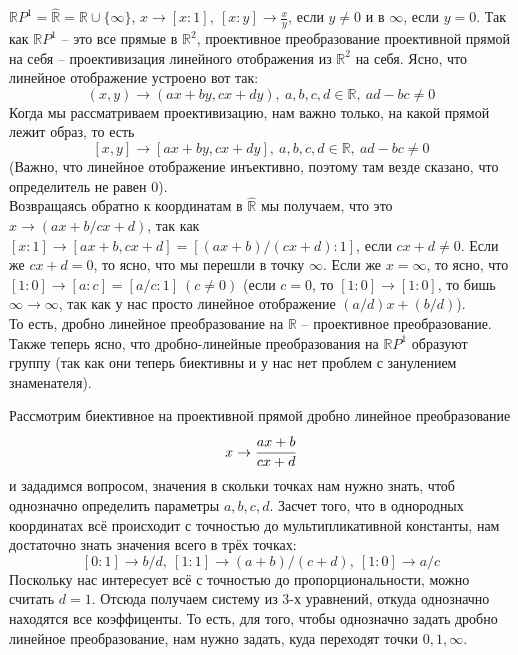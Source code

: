 \documentclass[11pt]{article}
\begin{document}
    \begin{example}
        $ \mathbb{R}P^1 = \widehat{\mathbb{R}} = \mathbb{R} \cup \{ \infty \}$, $x \to [x : 1], \ [x : y] \to \frac{x}{y}$, если $y \neq 0$ и в $\infty$, если $y = 0$.
        Так как $\mathbb{R}P^1$ -- это все прямые в $\mathbb{R}^2$, проективное преобразование проективной прямой на себя -- проективизация линейного отображения из $\mathbb{R}^2$ на себя. Ясно, что линейное отображение устроено вот так:
        \[ (x,  y) \to (ax + by , cx + dy), \ a, b, c, d \in \mathbb{R}, \ ad - bc \neq 0 \]
        Когда мы рассматриваем проективизацию, нам важно только, на какой прямой лежит образ, то есть
        \[ [x,  y] \to [ax + by , cx + dy], \ a, b, c, d \in \mathbb{R}, \ ad - bc \neq 0 \]
        (Важно, что линейное отображение инъективно, поэтому там везде сказано, что определитель не равен 0).\\
        Возвращаясь обратно к координатам в $\widehat{\mathbb{R}}$ мы получаем, что это $x \to (ax + b / cx + d)$, так как $[x : 1] \to [ax + b, cx + d] = [(ax + b) / (cx + d) : 1]$, если $cx + d \neq 0$. Если же $cx + d = 0$, то ясно, что мы перешли в точку $\infty$. Если же $x = \infty$, то ясно, что $[1 : 0] \to [a : c] = [a / c : 1] \ (c \neq 0)$ (если $c = 0$, то $[1 : 0] \to [1 : 0]$, то бишь $\infty \to \infty$, так как у нас просто линейное отображение $(a /d)x + (b / d)$).\\
        То есть, дробно линейное преобразование на $\mathbb{R}$ -- проективное преобразование. Также теперь ясно, что дробно-линейные преобразования на $\mathbb{R}P^1$ образуют группу (так как они теперь биективны и у нас нет проблем с занулением знаменателя).
    \end{example}

    \begin{example}
    Рассмотрим  биективное на проективной прямой дробно линейное преобразование
        \[ x \to \cfrac{ax + b}{cx + d}\]
        и зададимся вопросом, значения в скольки точках нам нужно знать, чтоб однозначно определить параметры $a, b, c, d$. Засчет того, что в однородных координатах всё происходит с точностью до мультипликативной константы, нам достаточно знать значения всего в трёх точках:
        \[ [0 : 1] \to b / d, \ [1 : 1] \to (a + b) / (c + d), \ [1 : 0] \to a / c\]
        Поскольку нас интересует всё с точностью до пропорциональности, можно считать $d = 1$. Отсюда получаем систему из 3-х уравнений, откуда однозначно находятся все коэффиценты. То есть, для того, чтобы однозначно задать дробно линейное преобразование, нам нужно задать, куда переходят точки $0, 1, \infty$.
    \end{example}
\end{document}
